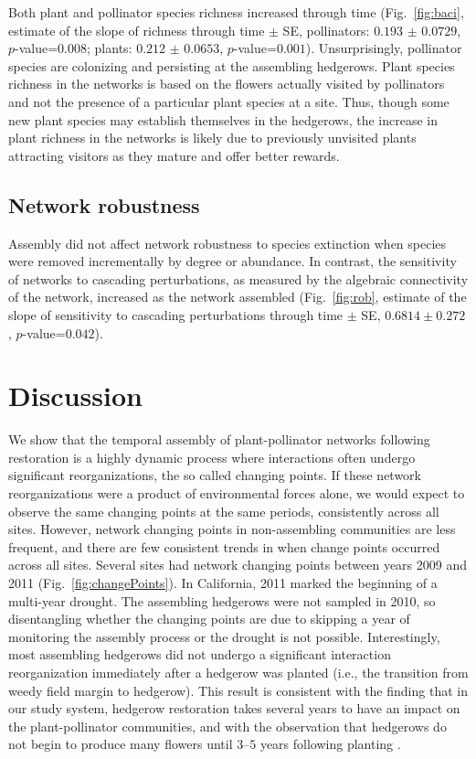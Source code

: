 \documentclass[12pt]{article}
\begin{document}
Both plant and pollinator species richness increased through time
(Fig.~\ref{fig:baci}, estimate of the slope of richness through time
$\pm$ SE, pollinators: $0.193$ $\pm$ $0.0729$, $p$-value=$0.008$;
plants: $0.212$ $\pm$ $0.0653$, $p$-value=$0.001$). Unsurprisingly,
pollinator species are colonizing and persisting at the assembling
hedgerows. Plant species richness in the networks is based on the
flowers actually visited by pollinators and not the presence of a
particular plant species at a site. Thus, though some new plant
species may establish themselves in the hedgerows, the increase in
plant richness in the networks is likely due to previously unvisited
plants attracting visitors as they mature and offer better rewards.

\subsection*{Network robustness}
Assembly did not affect network robustness to species
extinction when species were removed incrementally by
degree %
or abundance. %
In contrast, the sensitivity of networks to
cascading perturbations, as measured by the algebraic connectivity of
the network, increased as the network assembled (Fig.~\ref{fig:rob},
estimate of the slope of sensitivity to cascading perturbations
through time $\pm$ SE, $0.6814 \pm 0.272$, $p$-value=$0.042$).

\section*{Discussion}
\label{sec:discussion}

We show that the temporal assembly of plant-pollinator networks
following restoration is a highly dynamic process where interactions
often undergo significant reorganizations, the so called changing
points. If these network reorganizations were a product of
environmental forces alone, we would expect to observe the same
changing points at the same periods, consistently across all
sites. However, network changing points in non-assembling communities
are less frequent, and there are few consistent trends in when change
points occurred across all sites. Several sites had network changing
points between years 2009 and 2011 (Fig.~\ref{fig:changePoints}). In
California, 2011 marked the beginning of a multi-year drought. The
assembling hedgerows were not sampled in 2010, so disentangling
whether the changing points are due to skipping a year of monitoring
the assembly process or the drought is not possible. Interestingly,
most assembling hedgerows did not undergo a significant interaction
reorganization immediately after a hedgerow was planted (i.e., the
transition from weedy field margin to hedgerow). This result is
consistent with the finding that in our study system, hedgerow
restoration takes several years to have an impact on the
plant-pollinator communities, and with the observation that hedgerows
do not begin to produce many flowers until $3$--$5$ years following
planting \citep{kremen-2015-602}.
\end{document}
